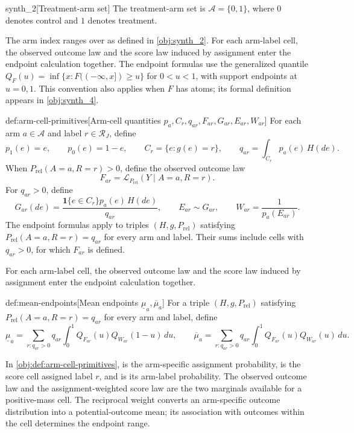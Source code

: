 \begin{definitionv}{synth_2}[Treatment-arm set]
The treatment-arm set is \(\mathcal A=\{0,1\}\), where \(0\) denotes control and \(1\) denotes treatment.
\end{definitionv}

The arm index  ranges over  as defined in \cref{obj:synth_2}. For each arm-label cell, the observed outcome law and the score law induced by assignment enter the endpoint calculation together.
The endpoint formulas use the generalized quantile \(Q_F(u)=\inf\{x:F((-\infty,x])\ge u\}\) for \(0<u<1\), with support endpoints at \(u=0,1\). This convention also applies when \(F\) has atoms; its formal definition appears in \cref{obj:synth_4}.

\begin{definitionv}{def:arm-cell-primitives}[Arm-cell quantities $p_a,C_r,q_{ar},F_{ar},G_{ar},E_{ar},W_{ar}$]
For each arm \(a\in\mathcal A\) and label \(r\in\mathcal R_J\), define
\[
p_1(e)=e,\qquad p_0(e)=1-e,\qquad
C_r=\{e:g(e)=r\},\qquad
q_{ar}=\int_{C_r}p_a(e)\,H(de).
\]
When \(P_{\mathrm{rel}}(A=a,R=r)>0\), define the observed outcome law
\[
F_{ar}=\mathcal L_{P_{\mathrm{rel}}}(Y\mid A=a,R=r).
\]
For \(q_{ar}>0\), define
\[
G_{ar}(de)=\frac{\mathbf 1\{e\in C_r\}p_a(e)\,H(de)}{q_{ar}},
\qquad E_{ar}\sim G_{ar},
\qquad W_{ar}=\frac{1}{p_a(E_{ar})}.
\]
The endpoint formulas apply to triples \((H,g,P_{\mathrm{rel}})\) satisfying \(P_{\mathrm{rel}}(A=a,R=r)=q_{ar}\) for every arm and label. Their sums include cells with \(q_{ar}>0\), for which \(F_{ar}\) is defined.
\end{definitionv}

For each arm-label cell, the observed outcome law and the score law induced by assignment enter the endpoint calculation together.

\begin{definitionv}{def:mean-endpoints}[Mean endpoints $\underline\mu_a,\overline\mu_a$]
For a triple \((H,g,P_{\mathrm{rel}})\) satisfying \(P_{\mathrm{rel}}(A=a,R=r)=q_{ar}\) for every arm and label, define
\[
\underline\mu_a
=\sum_{r:q_{ar}>0}q_{ar}\int_0^1
Q_{F_{ar}}(u)Q_{W_{ar}}(1-u)\,du,
\qquad
\overline\mu_a
=\sum_{r:q_{ar}>0}q_{ar}\int_0^1
Q_{F_{ar}}(u)Q_{W_{ar}}(u)\,du.
\]
\end{definitionv}

In \cref{obj:def:arm-cell-primitives},  is the arm-specific assignment probability,  is the score cell assigned label \(r\), and  is its arm-label probability. The observed outcome law  and the assignment-weighted score law  are the two marginals available for a positive-mass cell. The reciprocal weight  converts an arm-specific outcome distribution into a potential-outcome mean; its association with outcomes within the cell determines the endpoint range.


